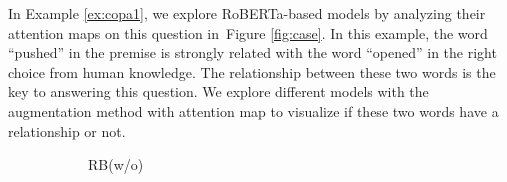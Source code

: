 \documentclass[letterpaper]{article} %
\newcommand{\figref}[1]{Figure \ref{#1}}
\newcommand{\exref}[1]{Example \ref{#1}}
\begin{document}
In \exref{ex:copa1}, we explore RoBERTa-based models by 
analyzing their attention maps on this question in~\figref{fig:case}.  
In this example, the word ``pushed'' in the premise is strongly
related with the word ``opened'' in the right choice from human knowledge. 
The relationship between these two words is the key to answering this question. 
We explore different models with the augmentation method with attention map 
to visualize if these two words have a relationship or not.
\begin{figure}[th!]
\centering
\begin{subfigure}[b]{0.20\textwidth}
\centering

\caption{RB(w/o)}
\label{fig:case_original}
\end{subfigure}
\hfill
\begin{subfigure}[b]{0.20\textwidth}
\centering

\end{subfigure}
\end{figure}
\end{document}
